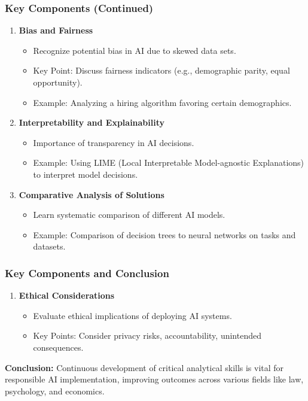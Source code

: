 \documentclass[aspectratio=169]{beamer}
\begin{document}
\begin{frame}[fragile]
    \frametitle{Key Components (Continued)}
    \begin{enumerate}[resume]
        \item \textbf{Bias and Fairness}
        \begin{itemize}
            \item Recognize potential bias in AI due to skewed data sets.
            \item Key Point: Discuss fairness indicators (e.g., demographic parity, equal opportunity).
            \item Example: Analyzing a hiring algorithm favoring certain demographics.
        \end{itemize}
        \item \textbf{Interpretability and Explainability}
        \begin{itemize}
            \item Importance of transparency in AI decisions.
            \item Example: Using LIME (Local Interpretable Model-agnostic Explanations) to interpret model decisions.
        \end{itemize}
        \item \textbf{Comparative Analysis of Solutions}
        \begin{itemize}
            \item Learn systematic comparison of different AI models.
            \item Example: Comparison of decision trees to neural networks on tasks and datasets.
        \end{itemize}
    \end{enumerate}
\end{frame}

\begin{frame}[fragile]
    \frametitle{Key Components and Conclusion}
    \begin{enumerate}[resume]
        \item \textbf{Ethical Considerations}
        \begin{itemize}
            \item Evaluate ethical implications of deploying AI systems.
            \item Key Points: Consider privacy risks, accountability, unintended consequences.
        \end{itemize}
    \end{enumerate}
    \textbf{Conclusion:} Continuous development of critical analytical skills is vital for responsible AI implementation, improving outcomes across various fields like law, psychology, and economics.
\end{frame}
\end{document}
